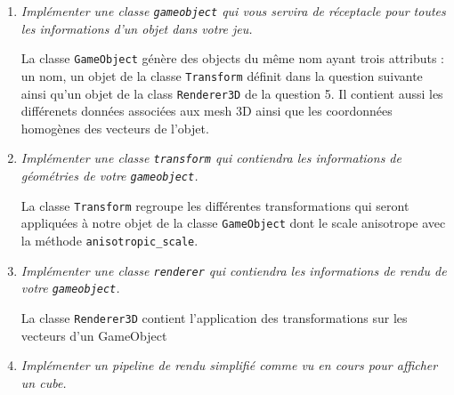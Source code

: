 \documentclass[a4paper,12pt]{article}
\begin{document}
\begin{enumerate}
  \item \emph{Implémenter une classe \texttt{gameobject} qui vous servira de réceptacle pour toutes les informations d'un objet dans votre jeu.}

  La classe \texttt{GameObject} génère des objects du même nom ayant trois attributs : un nom, un objet de la classe \texttt{Transform} définit dans la question suivante ainsi qu'un objet de la class \texttt{Renderer3D} de la question 5. Il contient aussi les différenets données associées aux mesh 3D ainsi que les coordonnées homogènes des vecteurs de l'objet.
  \newline
  

  \item \emph{Implémenter une classe \texttt{transform} qui contiendra les informations de géométries de votre \texttt{gameobject}.}
  

  La classe \texttt{Transform} regroupe les différentes transformations qui seront appliquées à notre objet de la classe \texttt{GameObject} dont le scale anisotrope avec la méthode \texttt{anisotropic\_scale}. \newline 


  \item \emph{Implémenter une classe \texttt{renderer} qui contiendra les informations de rendu de votre \texttt{gameobject}.}

  La classe \texttt{Renderer3D} contient l'application des transformations sur les vecteurs d'un GameObject  
  \newline


  \item \emph{Implémenter un pipeline de rendu simplifié comme vu en cours pour afficher un cube.}
  \newline
\end{enumerate}
\end{document}
